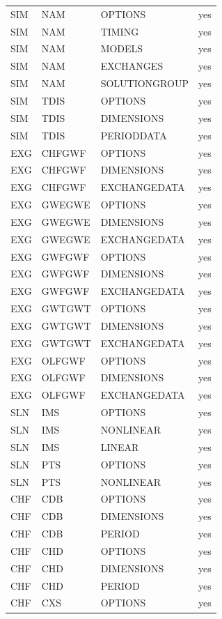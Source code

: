 \begin{longtable}{p{1.5cm} p{1.5cm} p{3cm} c}
\hline
SIM & NAM & OPTIONS & yes \\ 
SIM & NAM & TIMING & yes \\ 
SIM & NAM & MODELS & yes \\ 
SIM & NAM & EXCHANGES & yes \\ 
SIM & NAM & SOLUTIONGROUP & yes \\ 
\hline
SIM & TDIS & OPTIONS & yes \\ 
SIM & TDIS & DIMENSIONS & yes \\ 
SIM & TDIS & PERIODDATA & yes \\ 
\hline
EXG & CHFGWF & OPTIONS & yes \\ 
EXG & CHFGWF & DIMENSIONS & yes \\ 
EXG & CHFGWF & EXCHANGEDATA & yes \\ 
\hline
EXG & GWEGWE & OPTIONS & yes \\ 
EXG & GWEGWE & DIMENSIONS & yes \\ 
EXG & GWEGWE & EXCHANGEDATA & yes \\ 
\hline
EXG & GWFGWF & OPTIONS & yes \\ 
EXG & GWFGWF & DIMENSIONS & yes \\ 
EXG & GWFGWF & EXCHANGEDATA & yes \\ 
\hline
EXG & GWTGWT & OPTIONS & yes \\ 
EXG & GWTGWT & DIMENSIONS & yes \\ 
EXG & GWTGWT & EXCHANGEDATA & yes \\ 
\hline
EXG & OLFGWF & OPTIONS & yes \\ 
EXG & OLFGWF & DIMENSIONS & yes \\ 
EXG & OLFGWF & EXCHANGEDATA & yes \\ 
\hline
SLN & IMS & OPTIONS & yes \\ 
SLN & IMS & NONLINEAR & yes \\ 
SLN & IMS & LINEAR & yes \\ 
\hline
SLN & PTS & OPTIONS & yes \\ 
SLN & PTS & NONLINEAR & yes \\ 
\hline
CHF & CDB & OPTIONS & yes \\ 
CHF & CDB & DIMENSIONS & yes \\ 
CHF & CDB & PERIOD & yes \\ 
\hline
CHF & CHD & OPTIONS & yes \\ 
CHF & CHD & DIMENSIONS & yes \\ 
CHF & CHD & PERIOD & yes \\ 
\hline
CHF & CXS & OPTIONS & yes \\ 

\end{longtable}
